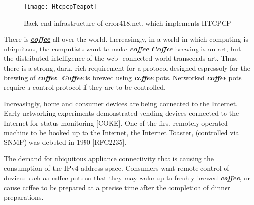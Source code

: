 \documentclass{article}
\begin{document}
\begin{figure}[h]
    \centering
    \texttt{[image: HtcpcpTeapot]}
    \caption{Back-end infrastructure of error418.net, which implements HTCPCP}
    \label{fig:mesh1}
    \end{figure}

There is \textbf{\textit{\underline{coffee}}} all over the world. Increasingly, in a world in which
   computing is ubiquitous, the computists want to make \textbf{\textit{\underline{coffee}}}.\textbf{\textit{\underline{Coffee}}}
   brewing is an art, but the distributed intelligence of the web-
   connected world transcends art.  Thus, there is a strong, dark, rich
   requirement for a protocol designed espressoly for the brewing of
   \textbf{\textit{\underline{coffee}}}. \textbf{\textit{\underline{Coffee}}} is brewed using \textbf{\textit{\underline{coffee}}}  pots.  Networked \textbf{\textit{\underline{coffee}}} pots
   require a control protocol if they are to be controlled.

   Increasingly, home and consumer devices are being connected to the
   Internet. Early networking experiments demonstrated vending devices
   connected to the Internet for status monitoring [COKE]. One of the
   first remotely operated machine to be hooked up to the Internet,
   the Internet Toaster, (controlled via SNMP) was debuted in 1990
   [RFC2235].

   

   The demand for ubiquitous appliance connectivity that is causing the
   consumption of the IPv4 address space. Consumers want remote control
   of devices such as coffee pots so that they may wake up to freshly
   brewed \textbf{\textit{\underline{coffee}}}, or cause coffee to be prepared at a precise time after
   the completion of dinner preparations. \cite{coffeeAuthors}
   
\end{document}
